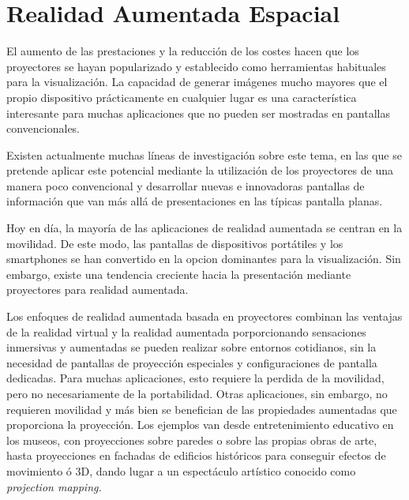 \section{Realidad Aumentada Espacial}
  El aumento de las prestaciones y la reducción de los costes hacen que los proyectores se hayan popularizado y establecido como herramientas habituales para la visualización. La capacidad de generar imágenes mucho mayores que el propio dispositivo prácticamente en cualquier lugar es una característica interesante para muchas aplicaciones que no pueden ser mostradas en pantallas convencionales. 

Existen actualmente muchas líneas de investigación sobre este tema, en las que se pretende aplicar este potencial mediante la utilización de los proyectores de una manera poco convencional y desarrollar nuevas e innovadoras pantallas de información que van más allá de presentaciones en las típicas pantalla planas.
 

Hoy en día, la mayoría de las aplicaciones de realidad aumentada se centran en la movilidad. De este modo, las pantallas de dispositivos portátiles y los smartphones se han convertido en la opcion dominantes para la visualización. Sin embargo, existe una tendencia creciente hacia la presentación mediante proyectores para realidad aumentada. 

Los enfoques de realidad aumentada basada en proyectores combinan las ventajas de la realidad virtual y la realidad aumentada porporcionando sensaciones inmersivas y aumentadas se pueden realizar sobre entornos cotidianos, sin la necesidad de pantallas de proyección especiales y configuraciones de pantalla dedicadas. Para muchas aplicaciones, esto requiere la perdida de la movilidad, pero no necesariamente de la portabilidad. Otras aplicaciones, sin embargo, no requieren movilidad y más bien se benefician de las propiedades aumentadas que proporciona la proyección. Los ejemplos van desde entretenimiento educativo en los museos, con proyecciones sobre paredes o sobre las propias obras de arte, hasta proyecciones en fachadas de edificios históricos para conseguir efectos de movimiento ó 3D, dando lugar a un espectáculo artístico conocido como \emph{projection mapping.}

